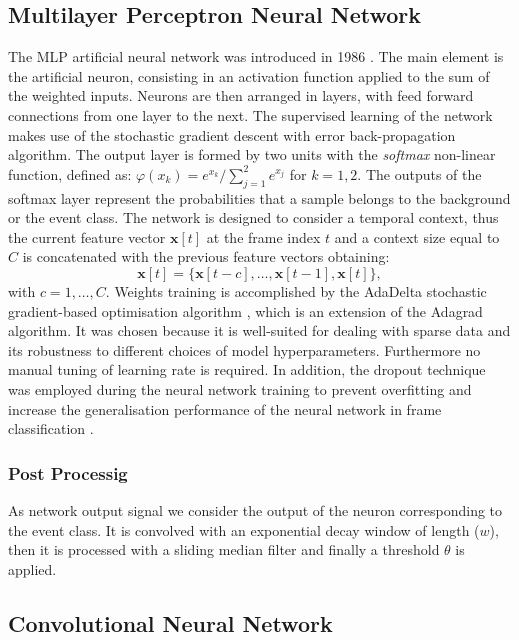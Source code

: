 \documentclass{article}
\begin{document}
\begin{sloppy}
\subsection{Multilayer Perceptron Neural Network}
The MLP artificial neural network was introduced in 1986 \cite{Rumelhart86-LRB}. The main element is the artificial neuron, consisting in an activation function applied to the sum of the weighted inputs. Neurons are then arranged in layers, with feed forward connections from one layer to the next. The supervised learning of the network makes use of the stochastic gradient descent with error back-propagation algorithm. The output layer is formed by two units with the \textit{softmax} non-linear function, defined as:  $\varphi(x_k) = e^{x_k}/\sum_{j=1}^{2}e^{x_j}$ for $k=1,2$. The outputs of the softmax layer represent the probabilities that a sample belongs to the background or the event class. 
The network is designed to consider a temporal context, thus the current feature vector $\mathbf{x}[t]$ at the frame index $t$ and a context size equal to $C$ is concatenated with the previous feature vectors obtaining:
\begin{equation}
\mathbf{x}[t] =  \{\mathbf{x}[t - c],\ldots,\mathbf{x}[t-1],\mathbf{x}[t]\},
\end{equation}
with $c = 1, \dots, C$. Weights training is accomplished by the AdaDelta stochastic gradient-based optimisation algorithm \cite{zeiler2012adadelta}, which is an extension of the Adagrad \cite{duchi2011adaptive} algorithm. It was chosen because it is well-suited for dealing with sparse data and its robustness to different choices of model hyperparameters. Furthermore no manual tuning of learning rate is required. In addition, the dropout technique was employed during the neural network training to prevent overfitting and increase the generalisation performance of the neural network in frame classification \cite{srivastava2014dropout}. 

\subsubsection{Post Processig}
As network output signal we consider the output of the neuron corresponding to the event class. It is convolved with an exponential decay window of length ($w$), then it is processed with a sliding median filter and finally a threshold $\theta$ is applied.

\subsection{Convolutional Neural Network}


\end{sloppy}
\end{document}
